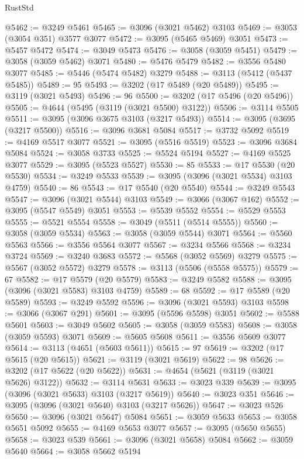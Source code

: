 \begin{lexlean}{RustStd}
\begin{coremodule}
{\begin{coremodule}
{{{{{{{{{{{{{{{{{{{{{{{{{{{{{{{{@5462 := @3249 @5461
@5465 := @3096 (@3021 @5462) @3103
@5469 := @3053 (@3054 @351) @3577 @3077
@5472 := @3095 (@5465 @5469) @3051
@5473 := @5457 @5472
@5474 := @3049 @5473
@5476 := @3058 (@3059 @5451)
@5479 := @3058 (@3059 @5462) @3071
@5480 := @5476 @5479
@5482 := @3556 @5480 @3077
@5485 := @5446 (@5474 @5482) @3279
@5488 := @3113 (@5412 (@5437 @5485))
@5489 := 95
@5493 := @3202 (@17 @5489 (@20 @5489))
@5495 := @3119 (@3021 @5493)
@5496 := 96
@5500 := @3202 (@17 @5496 (@20 @5496))
@5505 := @4644 (@5495 (@3119 (@3021 @5500) @3122))
@5506 := @3114 @5505
@5511 := @3095 (@3096 @3675 @3103 (@3217 @5493))
@5514 := @3095 (@3695 (@3217 @5500))
@5516 := @3096 @3681 @5084
@5517 := @3732 @5092
@5519 := @4169 @5517 @3077
@5521 := @3095 (@5516 @5519)
@5523 := @3096 @3684 @5084
@5524 := @3058 @3733
@5525 := @5524 @5194
@5527 := @4169 @5525 @3077
@5529 := @3095 (@5523 @5527)
@5530 := 85
@5533 := @17 @5530 (@20 @5530)
@5534 := @3249 @5533
@5539 := @3095 (@3096 (@3021 @5534) @3103 @4759)
@5540 := 86
@5543 := @17 @5540 (@20 @5540)
@5544 := @3249 @5543
@5547 := @3096 (@3021 @5544) @3103
@5549 := @3066 (@3067 @162)
@5552 := @3095 (@5547 @5549) @3051
@5553 := @5539 @5552
@5554 := @5529 @5553
@5555 := @5521 @5554
@5558 := @3049 (@5511 (@5514 @5555))
@5560 := @3058 (@3059 @5534)
@5563 := @3058 (@3059 @5544) @3071
@5564 := @5560 @5563
@5566 := @3556 @5564 @3077
@5567 := @3234 @5566
@5568 := @3234 @3724
@5569 := @3240 @3683
@5572 := @5568 (@3052 @5569) @3279
@5575 := @5567 (@3052 @5572) @3279
@5578 := @3113 (@5506 (@5558 @5575))
@5579 := 67
@5582 := @17 @5579 (@20 @5579)
@5583 := @3249 @5582
@5588 := @3095 (@3096 (@3021 @5583) @3103 @4759)
@5589 := 68
@5592 := @17 @5589 (@20 @5589)
@5593 := @3249 @5592
@5596 := @3096 (@3021 @5593) @3103
@5598 := @3066 (@3067 @291)
@5601 := @3095 (@5596 @5598) @3051
@5602 := @5588 @5601
@5603 := @3049 @5602
@5605 := @3058 (@3059 @5583)
@5608 := @3058 (@3059 @5593) @3071
@5609 := @5605 @5608
@5611 := @3556 @5609 @3077
@5614 := @3113 (@4651 (@5603 @5611))
@5615 := 97
@5619 := @3202 (@17 @5615 (@20 @5615))
@5621 := @3119 (@3021 @5619)
@5622 := 98
@5626 := @3202 (@17 @5622 (@20 @5622))
@5631 := @4654 (@5621 (@3119 (@3021 @5626) @3122))
@5632 := @3114 @5631
@5633 := @3023 @339
@5639 := @3095 (@3096 (@3021 @5633) @3103 (@3217 @5619))
@5640 := @3023 @351
@5646 := @3095 (@3096 (@3021 @5640) @3103 (@3217 @5626))
@5647 := @3023 @526
@5650 := @3096 (@3021 @5647) @5084
@5651 := @3059 @5633
@5653 := @3058 @5651 @5092
@5655 := @4169 @5653 @3077
@5657 := @3095 (@5650 @5655)
@5658 := @3023 @539
@5661 := @3096 (@3021 @5658) @5084
@5662 := @3059 @5640
@5664 := @3058 @5662 @5194
}}}}}}}}}}}}}}}}}}}}}}}}}}}}}}}}
\end{coremodule}}
\end{coremodule}
\end{lexlean}
